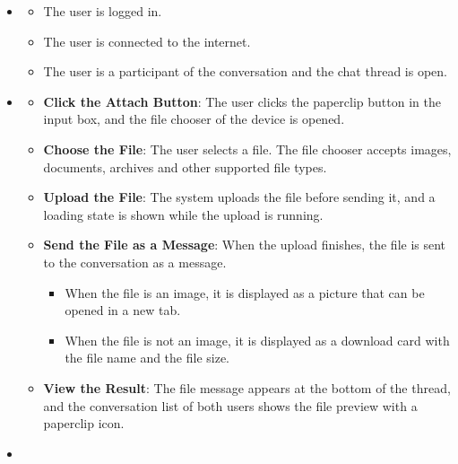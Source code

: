 \begin{itemize}[leftmargin=1.6em,topsep=4pt,itemsep=3pt,parsep=0pt,label=$\bullet$]
    \item {}

        \begin{itemize}[leftmargin=2.2em,topsep=2pt,itemsep=3pt,parsep=0pt,label=$\circ$]
            \item The user is logged in.
            \item The user is connected to the internet.
            \item The user is a participant of the conversation and the chat thread is open.
        \end{itemize}
    \item {}

        \begin{itemize}[leftmargin=2.2em,topsep=2pt,itemsep=3pt,parsep=0pt,label=$\circ$]
            \item \textbf{Click the Attach Button}: The user clicks the paperclip button in the input box, and the file chooser of the device is opened.
            \item \textbf{Choose the File}: The user selects a file. The file chooser accepts images, documents, archives and other supported file types.
            \item \textbf{Upload the File}: The system uploads the file before sending it, and a loading state is shown while the upload is running.
            \item \textbf{Send the File as a Message}: When the upload finishes, the file is sent to the conversation as a message.
                \begin{itemize}[leftmargin=2.2em,topsep=2pt,itemsep=3pt,parsep=0pt,label=$\blacksquare$]
                    \item When the file is an image, it is displayed as a picture that can be opened in a new tab.
                    \item When the file is not an image, it is displayed as a download card with the file name and the file size.
                \end{itemize}
            \item \textbf{View the Result}: The file message appears at the bottom of the thread, and the conversation list of both users shows the file preview with a paperclip icon.
        \end{itemize}
    \item {}


\end{itemize}
